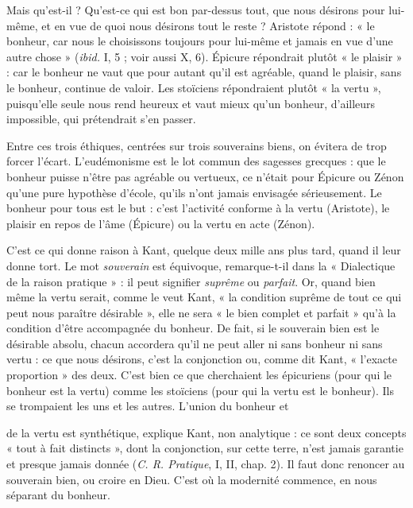 Mais qu’est-il ? Qu'est-ce qui est bon par-dessus tout, que nous désirons
pour lui-même, et en vue de quoi nous désirons tout le reste ? Aristote répond :
« le bonheur, car nous le choisissons toujours pour lui-même et jamais en vue
d’une autre chose » ({\it ibid.} I, 5 ; voir aussi X, 6). Épicure répondrait plutôt « le
plaisir » : car le bonheur ne vaut que pour autant qu’il est agréable, quand le
plaisir, sans le bonheur, continue de valoir. Les stoïciens répondraient plutôt
« la vertu », puisqu’elle seule nous rend heureux et vaut mieux qu’un bonheur,
d’ailleurs impossible, qui prétendrait s’en passer.

Entre ces trois éthiques, centrées sur trois souverains biens, on évitera de
trop forcer l'écart. L’eudémonisme est le lot commun des sagesses grecques :
que le bonheur puisse n’être pas agréable ou vertueux, ce n’était pour Épicure
ou Zénon qu’une pure hypothèse d’école, qu’ils n’ont jamais envisagée sérieusement.
Le bonheur pour tous est le but : c’est l’activité conforme à la vertu
(Aristote), le plaisir en repos de l’âme (Épicure) ou la vertu en acte (Zénon).

C’est ce qui donne raison à Kant, quelque deux mille ans plus tard, quand
il leur donne tort. Le mot {\it souverain} est équivoque, remarque-t-il dans la
« Dialectique de la raison pratique » : il peut signifier {\it suprême} ou {\it parfait}. Or,
quand bien même la vertu serait, comme le veut Kant, « la condition suprême
de tout ce qui peut nous paraître désirable », elle ne sera « le bien complet et
parfait » qu’à la condition d’être accompagnée du bonheur. De fait, si le souverain
bien est le désirable absolu, chacun accordera qu’il ne peut aller ni sans
bonheur ni sans vertu : ce que nous désirons, c’est la conjonction ou, comme
dit Kant, « l’exacte proportion » des deux. C’est bien ce que cherchaient les épicuriens
(pour qui le bonheur est la vertu) comme les stoïciens (pour qui la vertu
est le bonheur). Ils se trompaient les uns et les autres. L’union du bonheur et

de la vertu est synthétique, explique Kant, non analytique : ce sont deux concepts
« tout à fait distincts », dont la conjonction, sur cette terre, n’est jamais
garantie et presque jamais donnée ({\it C. R. Pratique}, I, II, chap. 2). Il faut donc
renoncer au souverain bien, ou croire en Dieu. C’est où la modernité commence,
en nous séparant du bonheur.

